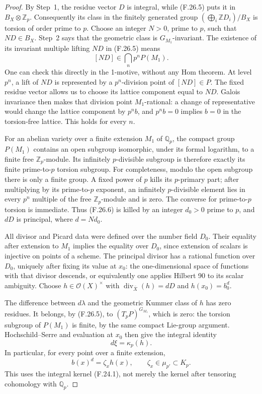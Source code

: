 \documentclass[11pt]{article}
\begin{document}
\begin{proof}
By Step~1, the residue vector \(D\) is integral, while
(F.26.5) puts it in \(B_X\otimes\mathbb Z_p\).
Consequently its class in the finitely generated group
\((\bigoplus_i\mathbb ZD_i)/B_X\) is torsion of order
prime to \(p\). Choose an integer \(N>0\), prime
to \(p\), such that \(ND\in B_X\).
Step~2 says that the geometric class is
\(G_{M_1}\)-invariant. The existence of its invariant
multiple lifting \(ND\) in (F.26.5) means
\[
                 [ND]\in\bigcap_n p^nP(M_1).           \tag{F.26.6}
\]
One can check this directly in the 1-motive, without
any Hom theorem. At level \(p^n\), a lift of \(ND\)
is represented by a \(p^n\)-division point of
\([ND]\in P\). The fixed residue vector allows us
to choose its lattice component equal to \(ND\).
Galois invariance then makes that division point
\(M_1\)-rational: a change of representative would
change the lattice component by \(p^n b\), and
\(p^n b=0\) implies \(b=0\) in the torsion-free
lattice. This holds for every \(n\).

For an abelian variety over a finite extension \(M_1\)
of \(\mathbb Q_p\), the compact group \(P(M_1)\)
contains an open subgroup isomorphic, under its formal
logarithm, to a finite free \(\mathbb Z_p\)-module.
Its infinitely \(p\)-divisible subgroup is therefore
exactly its finite prime-to-\(p\) torsion subgroup.
For completeness, modulo the open subgroup there is
only a finite group. A fixed power of \(p\) kills
its \(p\)-primary part; after multiplying by its
prime-to-\(p\) exponent, an infinitely \(p\)-divisible
element lies in every \(p^n\) multiple of the free
\(\mathbb Z_p\)-module and is zero. The converse for
prime-to-\(p\) torsion is immediate.
Thus (F.26.6) is killed by an integer \(d_0>0\)
prime to \(p\), and \(dD\) is principal, where
\(d=Nd_0\).

All divisor and Picard data were defined over the
number field \(D_0\). Their equality after extension
to \(M_1\) implies the equality over \(D_0\), since
extension of scalars is injective on points of a scheme.
The principal divisor has a rational function over
\(D_0\), uniquely after fixing its value at \(x_0\):
the one-dimensional space of functions with that divisor
descends, or equivalently one applies Hilbert 90 to its
scalar ambiguity. Choose
\(h\in\mathcal O(X)^\times\) with
\(\operatorname{div}_{\bar X}(h)=dD\) and
\(h(x_0)=b_0^d\).

The difference between \(d\lambda\) and the geometric
Kummer class of \(h\) has zero residues. It belongs,
by (F.26.5), to \((T_pP)^{G_{M_1}}\), which is zero:
the torsion subgroup of \(P(M_1)\) is finite, by
the same compact Lie-group argument. Hochschild--Serre
and evaluation at \(x_0\) then give the integral identity
\[
                         d\xi=\kappa_p(h).              \tag{F.26.7}
\]
In particular, for every point over a finite extension,
\[
                         b(x)^d=\zeta_xh(x),
                         \qquad\zeta_x\in\mu_{p'}\subset K_p.
                                                               \tag{F.26.8}
\]
This uses the integral kernel (F.24.1), not merely
the kernel after tensoring cohomology with \(\mathbb Q_p\).


\end{proof}
\end{document}
